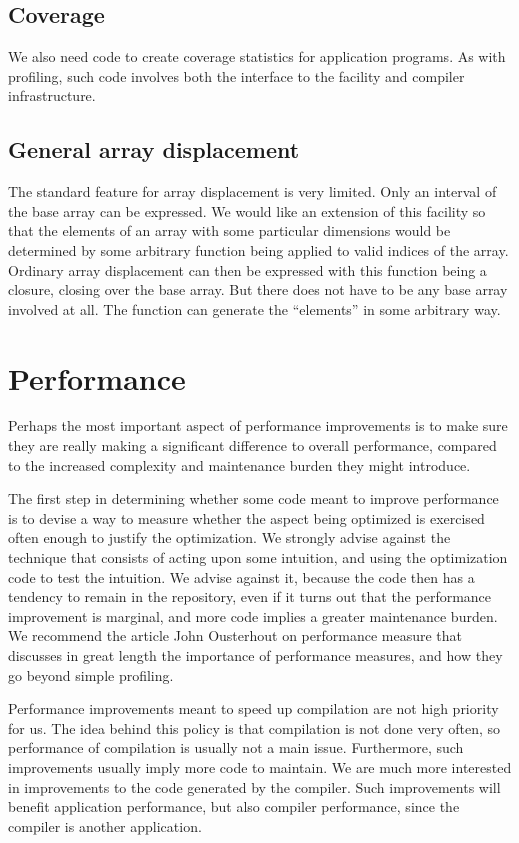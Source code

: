 \subsection{Coverage}

We also need code to create coverage statistics for application
programs.  As with profiling, such code involves both the interface to
the facility and compiler infrastructure.

\subsection{General array displacement}

The standard \commonlisp{} feature for array displacement is very
limited.  Only an interval of the base array can be expressed.  We
would like an extension of this facility so that the elements of an
array with some particular dimensions would be determined by some
arbitrary function being applied to valid indices of the array.
Ordinary array displacement can then be expressed with this function
being a closure, closing over the base array.  But there does not have
to be any base array involved at all.  The function can generate the
``elements'' in some arbitrary way.

\section{Performance}

Perhaps the most important aspect of performance improvements is to
make sure they are really making a significant difference to overall
performance, compared to the increased complexity and maintenance
burden they might introduce.

The first step in determining whether some code meant to improve
performance is to devise a way to measure whether the aspect being
optimized is exercised often enough to justify the optimization.  We
strongly advise against the technique that consists of acting upon
some intuition, and using the optimization code to test the
intuition.  We advise against it, because the code then has a tendency
to remain in the repository, even if it turns out that the performance
improvement is marginal, and more code implies a greater maintenance
burden.  We recommend the article \cite{10.1145/3213770}
John Ousterhout on performance measure that discusses in great length
the importance of performance measures, and how they go beyond simple
profiling.

Performance improvements meant to speed up compilation are not high
priority for us.  The idea behind this policy is that compilation is
not done very often, so performance of compilation is usually not a
main issue.  Furthermore, such improvements usually imply more code to
maintain.  We are much more interested in improvements to the code
generated by the compiler.  Such improvements will benefit application
performance, but also compiler performance, since the compiler is
another application.
